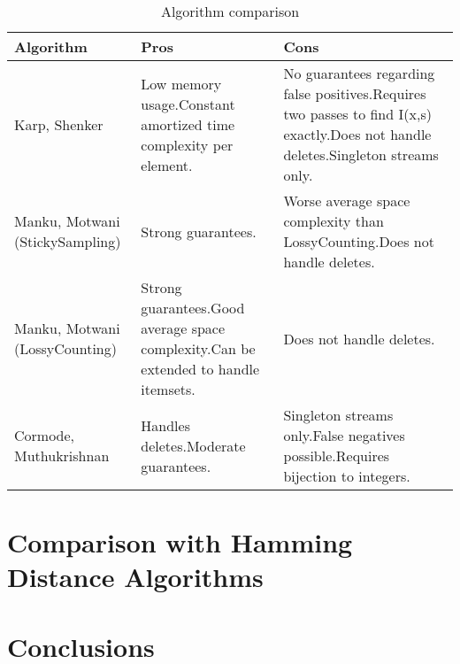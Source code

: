 \documentclass[a4paper]{article}
\begin{document}
\begin{table}
{\scriptsize 
\begin{tabulary}{1\textwidth}{LLL}
\hline \textbf{Algorithm}  %
& \textbf{Pros} & \textbf{Cons} \\ 
\hline Karp, Shenker %
& Low memory usage.\newline Constant amortized time complexity per element. & No guarantees regarding false positives.\newline Requires two passes to find I(x,s) exactly.\newline Does not handle deletes.\newline Singleton streams only. \\ 
\hline Manku, Motwani (StickySampling) %
& Strong guarantees. & Worse average space complexity than LossyCounting.\newline Does not handle deletes. \\ 
\hline Manku, Motwani (LossyCounting) %
& Strong guarantees.\newline Good average space complexity.\newline Can be extended to handle itemsets.  & Does not handle deletes. \\ 
\hline Cormode, Muthukrishnan  %
& Handles deletes.\newline Moderate guarantees. & Singleton streams only.\newline False negatives possible.\newline Requires bijection to integers. \\ 
\hline 

\end{tabulary}
}
\caption{Algorithm comparison}
\label{ComparisonTable}
\end{table}

\section{Comparison with Hamming Distance Algorithms}


\section{Conclusions}




\end{document}
